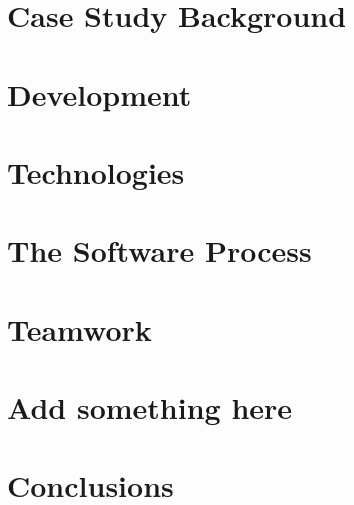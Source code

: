 \documentclass{l3proj}
\begin{document}


\newpage

\section{Case Study Background}
\label{case_study}



\newpage

\section{Development}
\label{development}



\newpage

\section{Technologies}
\label{technologies}



\newpage

\section{The Software Process}
\label{software_process}



\newpage

\section{Teamwork}
\label{teamwork}



\newpage

\section{Add something here}

\newpage

\section{Conclusions}
\label{conclusions}





\end{document}
